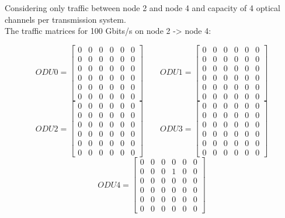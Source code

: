 \vspace{13pt}

\newpage
\vspace{11pt}

Considering only traffic between node 2 and node 4 and capacity of 4 optical channels per transmission system. \\

The traffic matrices for 100 Gbits/s on node 2 -> node 4:

\[
ODU0=
\begin{bmatrix}
0 & 0 & 0 & 0 & 0 & 0 \\
0 & 0 & 0 & 0 & 0 & 0 \\
0 & 0 & 0 & 0 & 0 & 0 \\
0 & 0 & 0 & 0 & 0 & 0 \\
0 & 0 & 0 & 0 & 0 & 0 \\
0 & 0 & 0 & 0 & 0 & 0
\end{bmatrix}
\qquad ODU1=
\begin{bmatrix}
0 & 0 & 0 & 0 & 0 & 0 \\
0 & 0 & 0 & 0 & 0 & 0 \\
0 & 0 & 0 & 0 & 0 & 0 \\
0 & 0 & 0 & 0 & 0 & 0 \\
0 & 0 & 0 & 0 & 0 & 0 \\
0 & 0 & 0 & 0 & 0 & 0
\end{bmatrix}
\]
\[
ODU2=
\begin{bmatrix}
0 & 0 & 0 & 0 & 0 & 0 \\
0 & 0 & 0 & 0 & 0 & 0 \\
0 & 0 & 0 & 0 & 0 & 0 \\
0 & 0 & 0 & 0 & 0 & 0 \\
0 & 0 & 0 & 0 & 0 & 0 \\
0 & 0 & 0 & 0 & 0 & 0
\end{bmatrix}
\qquad ODU3=
\begin{bmatrix}
0 & 0 & 0 & 0 & 0 & 0 \\
0 & 0 & 0 & 0 & 0 & 0 \\
0 & 0 & 0 & 0 & 0 & 0 \\
0 & 0 & 0 & 0 & 0 & 0 \\
0 & 0 & 0 & 0 & 0 & 0 \\
0 & 0 & 0 & 0 & 0 & 0
\end{bmatrix}
\]
\[
ODU4=
\begin{bmatrix}
0 & 0 & 0 & 0 & 0 & 0 \\
0 & 0 & 0 & 1 & 0 & 0 \\
0 & 0 & 0 & 0 & 0 & 0 \\
0 & 0 & 0 & 0 & 0 & 0 \\
0 & 0 & 0 & 0 & 0 & 0 \\
0 & 0 & 0 & 0 & 0 & 0
\end{bmatrix}
\]

